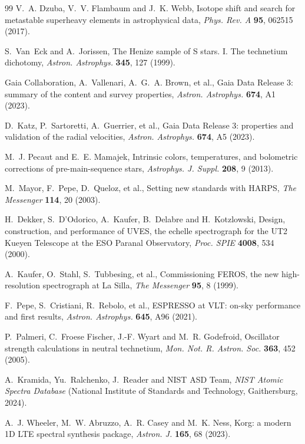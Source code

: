 \documentclass[3p,11pt]{elsarticle}
\begin{document}
\begin{thebibliography}{99}
V.~A. Dzuba, V.~V. Flambaum and J.~K. Webb, Isotope shift and search for metastable
superheavy elements in astrophysical data, \emph{Phys. Rev. A} \textbf{95}, 062515
(2017).

S.~Van~Eck and A.~Jorissen, The Henize sample of S stars. I. The technetium dichotomy,
\emph{Astron. Astrophys.} \textbf{345}, 127 (1999).

Gaia Collaboration, A.~Vallenari, A.~G.~A. Brown, et al., Gaia Data Release 3: summary
of the content and survey properties, \emph{Astron. Astrophys.} \textbf{674}, A1 (2023).

D.~Katz, P.~Sartoretti, A.~Guerrier, et al., Gaia Data Release 3: properties and
validation of the radial velocities, \emph{Astron. Astrophys.} \textbf{674}, A5 (2023).

M.~J. Pecaut and E.~E. Mamajek, Intrinsic colors, temperatures, and bolometric
corrections of pre-main-sequence stars, \emph{Astrophys. J. Suppl.} \textbf{208}, 9
(2013).

M.~Mayor, F.~Pepe, D.~Queloz, et al., Setting new standards with HARPS, \emph{The
Messenger} \textbf{114}, 20 (2003).

H.~Dekker, S.~D'Odorico, A.~Kaufer, B.~Delabre and H.~Kotzlowski, Design, construction,
and performance of UVES, the echelle spectrograph for the UT2 Kueyen Telescope at the
ESO Paranal Observatory, \emph{Proc. SPIE} \textbf{4008}, 534 (2000).

A.~Kaufer, O.~Stahl, S.~Tubbesing, et al., Commissioning FEROS, the new high-resolution
spectrograph at La Silla, \emph{The Messenger} \textbf{95}, 8 (1999).

F.~Pepe, S.~Cristiani, R.~Rebolo, et al., ESPRESSO at VLT: on-sky performance and first
results, \emph{Astron. Astrophys.} \textbf{645}, A96 (2021).

P.~Palmeri, C.~Froese Fischer, J.-F. Wyart and M.~R. Godefroid, Oscillator strength
calculations in neutral technetium, \emph{Mon. Not. R. Astron. Soc.} \textbf{363}, 452
(2005).

A.~Kramida, Yu.~Ralchenko, J.~Reader and NIST ASD Team, \emph{NIST Atomic Spectra
Database} (National Institute of Standards and Technology, Gaithersburg, 2024).

A.~J. Wheeler, M.~W. Abruzzo, A.~R. Casey and M.~K. Ness, Korg: a modern 1D LTE spectral
synthesis package, \emph{Astron. J.} \textbf{165}, 68 (2023).


\end{thebibliography}
\end{document}
